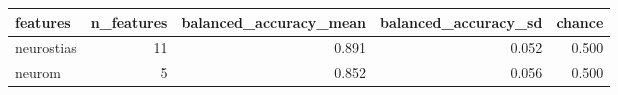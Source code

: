 \begin{tabular}{lrrrr}
\toprule
features & n_features & balanced_accuracy_mean & balanced_accuracy_sd & chance \\
\midrule
neurostias & 11 & 0.891 & 0.052 & 0.500 \\
neurom & 5 & 0.852 & 0.056 & 0.500 \\
\bottomrule
\end{tabular}

